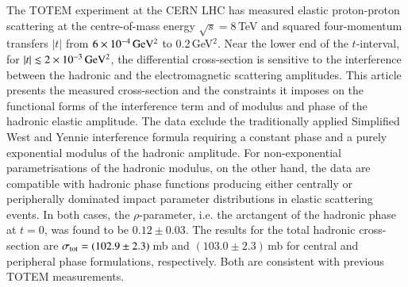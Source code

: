 The TOTEM experiment at the CERN LHC has measured elastic proton-proton 
scattering at the centre-of-mass energy 
$\sqrt{s}=8\,$TeV and squared four-momentum transfers $|t|$ from $6\times10^{-4}\,\rm GeV^{2}$ to 0.2\,GeV$^{2}$.
Near the lower end of the $t$-interval, for
$|t| \lesssim 2\times10^{-3}\,\rm GeV^{2}$, the differential cross-section is 
sensitive to the 
interference between the hadronic and the electromagnetic scattering amplitudes.
This article presents the measured cross-section and the constraints it 
imposes on the functional forms of the interference term and of modulus and
phase of the hadronic elastic amplitude. The data exclude the traditionally 
applied Simplified West and Yennie interference formula requiring a constant 
phase and a purely exponential modulus of the hadronic amplitude. 
For non-exponential parametrisations of the hadronic 
modulus, on the other hand, the data are compatible with hadronic phase 
functions producing either centrally or peripherally dominated impact 
parameter distributions in elastic scattering events. In both cases, 
the $\rho$-parameter, i.e. the arctangent of the hadronic phase at $t = 0$,
was found to be $0.12 \pm 0.03$. The results for the total hadronic 
cross-section are $\sigma_{\rm tot} = (102.9 \pm 2.3)$\,mb and 
$(103.0 \pm 2.3)$\,mb for central and peripheral phase formulations, 
respectively. Both are consistent with previous TOTEM measurements.
